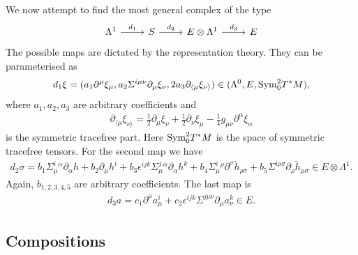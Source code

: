 \documentclass[10pt]{report}
\theoremstyle{definition}
\begin{document}
We now attempt to find the most general complex of the type
\begin{equation}
\begin{tikzcd}\label{complex-spaces}
\Lambda^1 \arrow{r}{d_1} & S \arrow{r}{d_2} & E\otimes \Lambda^1 \arrow{r}{d_3} & E
\end{tikzcd}
\end{equation}
The possible maps are dictated by the representation theory. They can be parameterised as
\begin{align}\label{d1-gen}
d_1 \xi = ( a_1 \partial^\mu \xi_\mu, a_2 \Sigma^{i\mu\nu} \partial_\mu \xi_\nu, 2 a_3 \partial_{\langle\mu} \xi_{\nu\rangle}) \in ( \Lambda^0, E, {\rm Sym}_0^2 T^*M) ,
\end{align}
where $a_1, a_2, a_3$ are arbitrary coefficients and
\begin{align}
\partial_{\langle\mu} \xi_{\nu\rangle}=
\frac{1}{2}\partial_{\mu} \xi_{\nu} + \frac{1}{2}\partial_{\nu} \xi_{\mu} - \frac{1}{4} g_{\mu\nu} \partial^\alpha \xi_\alpha
\end{align}
is the symmetric tracefree part. 
Here ${\rm Sym}_0^2 T^*M$ is the space of symmetric tracefree tensors. For the second map we have
\begin{align}\label{d2-gen}
d_2 \sigma = b_1 \Sigma^i_\mu{}^\alpha \partial_\alpha h + b_2 \partial_\mu h^i + b_3 \epsilon^{ijk} \Sigma^j_\mu{}^\alpha \partial_\alpha h^k + b_4 \Sigma^i_\mu{}^\rho \partial^\sigma \tilde{h}_{\rho\sigma} + b_5 \Sigma^{i\rho\sigma}  \partial_\rho \tilde{h}_{\mu\sigma} \in E\otimes\Lambda^1.
\end{align}
Again, $b_{1,2,3,4,5}$ are arbitrary coefficients. The last map is
\begin{align}\label{d3-gen}
d_3 a = c_1 \partial^\mu a_\mu^i + c_2 \epsilon^{ijk} \Sigma^{j\mu\nu} \partial_\mu a_\nu^k \in E.
\end{align}

\subsection{Compositions}
\end{document}
